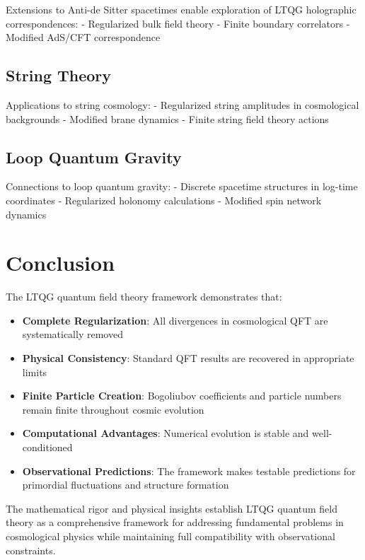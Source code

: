 \documentclass[11pt,a4paper]{article}
\begin{document}
Extensions to Anti-de Sitter spacetimes enable exploration of LTQG holographic correspondences:
- Regularized bulk field theory
- Finite boundary correlators
- Modified AdS/CFT correspondence

\subsection{String Theory}

Applications to string cosmology:
- Regularized string amplitudes in cosmological backgrounds
- Modified brane dynamics
- Finite string field theory actions

\subsection{Loop Quantum Gravity}

Connections to loop quantum gravity:
- Discrete spacetime structures in log-time coordinates
- Regularized holonomy calculations
- Modified spin network dynamics

\section{Conclusion}

The LTQG quantum field theory framework demonstrates that:

\begin{itemize}
\item \textbf{Complete Regularization}: All divergences in cosmological QFT are systematically removed

\item \textbf{Physical Consistency}: Standard QFT results are recovered in appropriate limits

\item \textbf{Finite Particle Creation}: Bogoliubov coefficients and particle numbers remain finite throughout cosmic evolution

\item \textbf{Computational Advantages}: Numerical evolution is stable and well-conditioned

\item \textbf{Observational Predictions}: The framework makes testable predictions for primordial fluctuations and structure formation
\end{itemize}

The mathematical rigor and physical insights establish LTQG quantum field theory as a comprehensive framework for addressing fundamental problems in cosmological physics while maintaining full compatibility with observational constraints.
\end{document}
